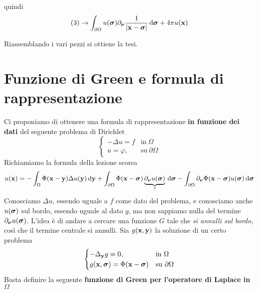 \begin{dimostrazione}
\begin{itemize}
              quindi
              \begin{equation*}
                  (3)\rightarrow \int _{\partial \Omega } u(\bm{\sigma}) \partial _{\bm{\nu}}\frac{1}{| \mathbf{x} -\bm{\sigma}| } \,\mathrm d \bm{\sigma} +4\pi u(\mathbf{x})
              \end{equation*}

              Riassemblando i vari pezzi si ottiene la tesi.
    \end{itemize}
\end{dimostrazione}

\section{Funzione di Green e formula di rappresentazione}

Ci proponiamo di ottenere una formula di rappresentazione \textbf{in funzione dei dati} del seguente problema di Dirichlet
\begin{equation}
    \begin{cases}
        -\Delta u=f & \text{in} \ \Omega          \\
        u=\varphi , & \text{su} \ \partial \Omega
    \end{cases}
    \label{eq:sol-green-pb-dirichlet}
\end{equation}
Richiamiamo la formula della lezione scorsa
\begin{equation}
    u(\mathbf{x}) =-\int _{\Omega } \Phi (\mathbf{x}-\mathbf{y}) \Delta u(\mathbf{y}) \,\mathrm d \mathbf{y}+\int _{\partial \Omega } \Phi (\mathbf{x}-\bm{\sigma}) \underbrace{\partial _{\bm{\nu}} u(\bm{\sigma})}_{?} \,\mathrm d \bm{\sigma} -\int _{\partial \Omega } \partial _{\bm{\nu}} \Phi (\mathbf{x}-\bm{\sigma}) u(\bm{\sigma}) \,\mathrm d \bm{\sigma}
    \label{eq:richiamo-formula-green}
\end{equation}
Conosciamo $\Delta u$, essendo uguale a $f$ come dato del problema, e conosciamo anche $u(\bm{\sigma})$ sul bordo, essendo uguale al dato $g$, ma non sappiamo nulla del termine $\partial _{\bm{\nu}} u(\bm{\sigma})$. L'idea è di andare a cercare una funzione $G$ tale che \textit{si annulli sul bordo}, così che il termine centrale si annulli. Sia $g(\mathbf{x},\mathbf{y})$ la soluzione di un certo problema
\begin{equation}
    \begin{cases}
        -\Delta _{\y} g=0,           & \text{in} \ \Omega          \\
        g(\x,\sigg) =\Phi (\x-\sigg) & \text{su} \ \partial \Omega
    \end{cases}
    \label{eq:sol-green-pb-unico}
\end{equation}
Basta definire la seguente \textbf{funzione di Green per l'operatore di Laplace in} $\Omega $
